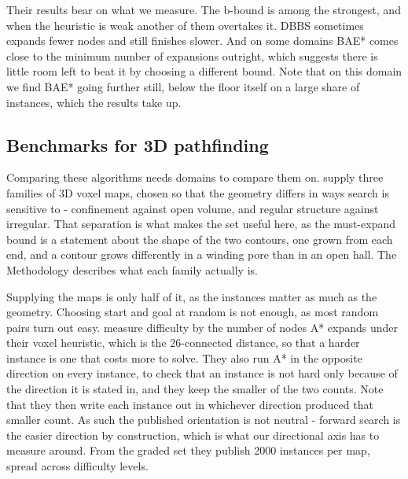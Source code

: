 \documentclass[letterpaper]{article} %
\begin{document}
Their results bear on what we measure. The b-bound is among the strongest, and when the heuristic is weak another of them overtakes it. DBBS sometimes expands fewer nodes and still finishes slower. And on some domains BAE* comes close to the minimum number of expansions outright, which suggests there is little room left to beat it by choosing a different bound. Note that on this domain we find BAE* going further still, below the floor itself on a large share of instances, which the results take up.

\subsection{Benchmarks for 3D pathfinding}
Comparing these algorithms needs domains to compare them on. \citet{nobes2023voxel} supply three families of 3D voxel maps, chosen so that the geometry differs in ways search is sensitive to - confinement against open volume, and regular structure against irregular. That separation is what makes the set useful here, as the must-expand bound is a statement about the shape of the two contours, one grown from each end, and a contour grows differently in a winding pore than in an open hall. The Methodology describes what each family actually is.

Supplying the maps is only half of it, as the instances matter as much as the geometry. Choosing start and goal at random is not enough, as most random pairs turn out easy. \citet{nobes2023voxel} measure difficulty by the number of nodes A* expands under their voxel heuristic, which is the 26-connected distance, so that a harder instance is one that costs more to solve. They also run A* in the opposite direction on every instance, to check that an instance is not hard only because of the direction it is stated in, and they keep the smaller of the two counts. Note that they then write each instance out in whichever direction produced that smaller count. As such the published orientation is not neutral - forward search is the easier direction by construction, which is what our directional axis has to measure around. From the graded set they publish 2000 instances per map, spread across difficulty levels.
\end{document}
